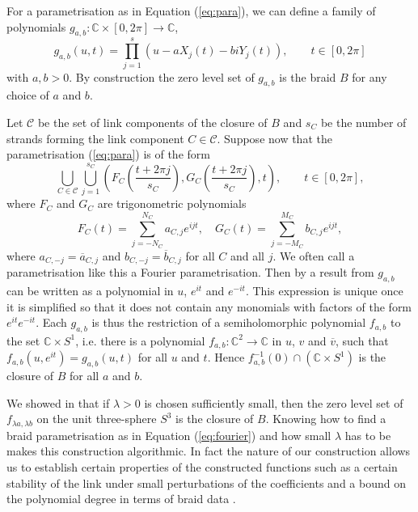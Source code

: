 \documentclass[notitlepage,12pt]{revtex4-1}
\begin{document}
For a parametrisation as in Equation (\ref{eq:para}), we can define a family of polynomials $g_{a,b}:\mathbb{C}\times[0,2\pi]\to\mathbb{C}$,
\begin{equation}
\label{eq:gab}
g_{a,b}(u,t)=\prod_{j=1}^{s}\left(u-aX_{j}(t)-biY_{j}(t)\right),\qquad t\in[0,2\pi]
\end{equation}
with $a,b>0$. By construction the zero level set of $g_{a,b}$ is the braid $B$ for any choice of $a$ and $b$.

Let $\mathcal{C}$ be the set of link components of the closure of $B$ and $s_{C}$ be the number of strands forming the link component $C\in\mathcal{C}$. Suppose now that the parametrisation (\ref{eq:para}) is of the form
\begin{equation}
\label{eq:fourier}
\bigcup_{C\in\mathcal{C}}\bigcup_{j=1}^{s_{C}}\left(F_{C}\left(\frac{t+2\pi j}{s_{C}}\right),G_{C}\left(\frac{t+2\pi j}{s_{C}}\right),t\right),\qquad t\in[0,2\pi],
\end{equation}
where $F_{C}$ and $G_{C}$ are trigonometric polynomials
\begin{equation}
\label{eq:trigpoly}
F_{C}(t)=\sum_{j=-N_{C}}^{N_{C}}a_{C,j}e^{ijt},\quad G_{C}(t)=\sum_{j=-M_{C}}^{M_{C}}b_{C,j}e^{ijt},
\end{equation} 
where $a_{C,-j}=\overline{a}_{C,j}$ and $b_{C,-j}=\overline{b}_{C,j}$ for all $C$ and all $j$. We often call a parametrisation like this a Fourier parametrisation.
Then by a result from \cite{bode:2016polynomial} $g_{a,b}$ can be written as a polynomial in $u$, $e^{it}$ and $e^{-it}$. This expression  is unique once it is simplified so that it does not contain any monomials with factors of the form $e^{it}e^{-it}$. Each $g_{a,b}$ is thus the restriction of a semiholomorphic polynomial $f_{a,b}$ to the set $\mathbb{C}\times S^{1}$, i.e. there is a  polynomial $f_{a,b}:\mathbb{C}^{2}\to\mathbb{C}$ in $u$, $v$ and $\overline{v}$, such that $f_{a,b}(u,e^{it})=g_{a,b}(u,t)$ for all $u$ and $t$. Hence $f_{a,b}^{-1}(0)\cap(\mathbb{C}\times S^{1})$ is the closure of $B$ for all $a$ and $b$.

We showed in \cite{bode:2016polynomial} that if $\lambda>0$ is chosen sufficiently small, then the zero level set of $f_{\lambda a,\lambda b}$ on the unit three-sphere $S^{3}$ is the closure of $B$. Knowing how to find a braid parametrisation as in Equation (\ref{eq:fourier}) and how small $\lambda$ has to be makes this construction algorithmic.
In fact the nature of our construction allows us to establish certain properties of the constructed functions such as a certain stability of the link under small perturbations of the coefficients and a bound on the polynomial degree in terms of braid data \cite{bode:2016polynomial}. 
\end{document}
